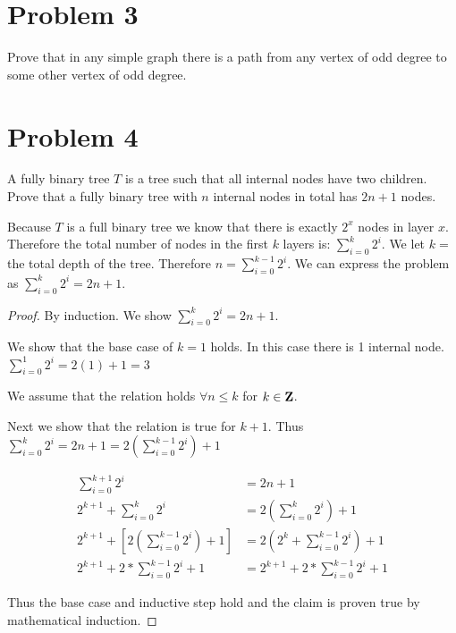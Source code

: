 \documentclass[11pt]{article}
\begin{document}

\newpage
\section*{Problem 3}

Prove that in any simple graph there is a path from any vertex of odd degree
to some other vertex of odd degree.
\newline


\newpage
\section*{Problem 4}

A fully binary tree $T$ is a tree such that all internal nodes have
two children. Prove that a fully binary tree with $n$ internal nodes
in total has $2n+1$ nodes.
\newline

Because $T$ is a full binary tree we know that there is exactly $2^x$ nodes in layer $x$. Therefore the total number of nodes in the first $k$ layers is: $\sum _{i = 0}^{k} 2^i$. We let $k = $ the total depth of the tree. Therefore $n = \sum _{i = 0}^{k-1} 2^i$. We can express the problem as $\sum _{i = 0}^{k} 2^i = 2n + 1$. 


\begin{proof}
By induction. We show $\sum _{i = 0}^{k} 2^i = 2n + 1$.

We show that the base case of $k = 1$ holds. In this case there is 1 internal node. $\sum _{i = 0}^{1} 2^i = 2(1) + 1 = 3$

We assume that the relation holds $\forall n \leq k$ for $k \in \mathbf{Z}$.

Next we show that the relation is true for $k + 1$. Thus $\sum _{i = 0}^{k} 2^i = 2n + 1 = 2 \left( \sum _{i = 0}^{k-1} 2^i \right) + 1$

\begin{equation}
\begin{split}
\sum _{i = 0}^{k + 1} 2^i &= 2n + 1\\
2 ^{k+1} + \sum _{i = 0}^{k} 2^i &= 2 (\sum _{i = 0}^{k} 2^i) + 1\\
2 ^{k+1} + \left [2 \left( \sum _{i = 0}^{k-1} 2^i \right) + 1 \right ] &= 2 \left( 2^k + \sum _{i = 0}^{k-1} 2^i \right) + 1\\
2 ^{k+1} + 2 * \sum _{i = 0}^{k-1} 2^i + 1 &= 2^{k + 1} + 2 * \sum _{i = 0}^{k-1} 2^i + 1
\end{split}
\end{equation} 

Thus the base case and inductive step hold and the claim is proven true by mathematical induction.
\end{proof}
\end{document}
